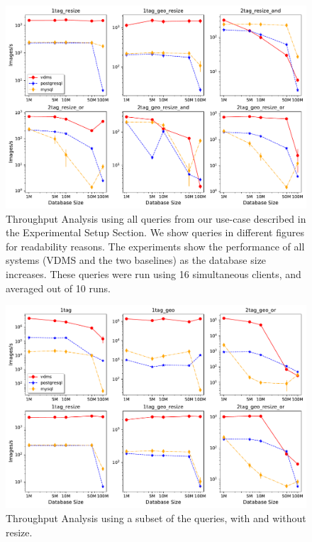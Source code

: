\begin{figure}[ht!]
\includegraphics[width=\columnwidth]{figures/plot_th_16_mosaic_results_throughput}
\caption{Throughput Analysis using all queries from our use-case
described in the Experimental Setup Section.
We show queries in different figures for readability reasons.
The experiments show the performance of all systems (VDMS and the two baselines) as the
database size increases.
These queries were run using 16 simultaneous clients, and averaged out of 10 runs.}
\label{fig:q_throughput_16}
\end{figure}


\begin{figure}[h!]
\includegraphics[width=\columnwidth]{figures/plot_th_56_mosaic_results_throughput_resize}
\caption{Throughput Analysis using a subset of the queries, with and without resize.}
\label{fig:q_throughput_56_resize}
\end{figure}

